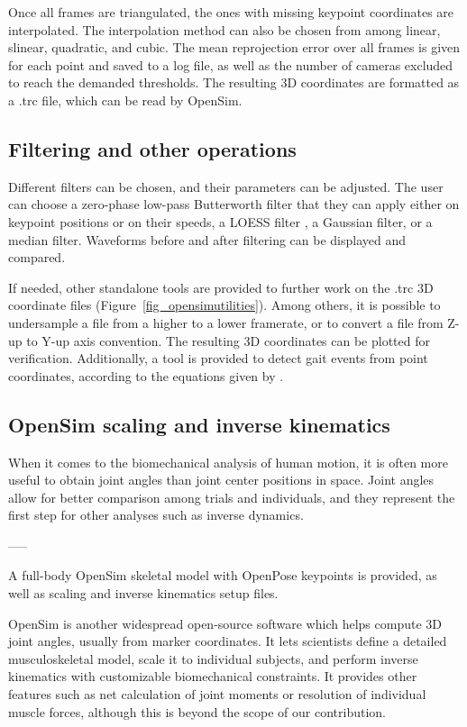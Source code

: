 Once all frames are triangulated, the ones with missing keypoint coordinates are interpolated. The interpolation method can also be chosen from among linear, slinear, quadratic, and cubic. The mean reprojection error over all frames is given for each point and saved to a log file, as well as the number of cameras excluded to reach the demanded thresholds. The resulting 3D coordinates are formatted as a .trc file, which can be read by OpenSim.


\subsection{Filtering and other operations}

Different filters can be chosen, and their parameters can be adjusted. The user can choose a zero-phase low-pass Butterworth filter \cite{Butterworth1930} that they can apply either on keypoint positions or on their speeds, a LOESS filter \cite{Cleveland1981}, a Gaussian filter, or a median filter. Waveforms before and after filtering can be displayed and compared.

If needed, other standalone tools are provided to further work on the .trc 3D coordinate files (Figure~\ref{fig_opensimutilities}). Among others, it is possible to undersample a file from a higher to a lower framerate, or to convert a file from Z-up to Y-up axis convention. The resulting 3D coordinates can be plotted for verification. Additionally, a tool is provided to detect gait events from point coordinates, according to the equations given by \cite{Zeni_2008}.


\subsection{OpenSim scaling and inverse kinematics}

When it comes to the biomechanical analysis of human motion, it is often more useful to obtain joint angles than joint center positions in space. Joint angles allow for better comparison among trials and individuals, and they represent the first step for other analyses such as inverse dynamics. 

-----

A full-body OpenSim \cite{Delp2007,Seth2018} skeletal model with OpenPose keypoints is provided, as well as scaling and inverse kinematics setup files.

OpenSim is another widespread open-source software which helps compute 3D joint angles, usually from marker coordinates. It lets scientists define a detailed musculoskeletal model, scale it to individual subjects, and perform inverse kinematics with customizable biomechanical constraints. It provides other features such as net calculation of joint moments or resolution of individual muscle forces, although this is beyond the scope of our contribution.

